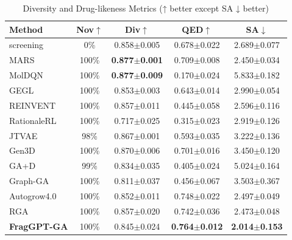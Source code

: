 \documentclass[lettersize,journal]{IEEEtran}
\begin{document}
\begin{table}[!t]
    \caption{Diversity and Drug-likeness Metrics (↑ better except SA ↓ better)}
    \label{tab:diversity_metrics}
    \centering    
    \small
    \setlength{\tabcolsep}{4pt}
    
    \begin{tabular}{l c c c c}
        \hline\hline
        Method & Nov$\uparrow$ & Div$\uparrow$ & QED$\uparrow$ & SA$\downarrow$ \\
        \hline
        screening\cite{graff2021accelerating} & 0\% & 0.858$\pm$0.005 & 0.678$\pm$0.022 & 2.689$\pm$0.077 \\
        MARS\cite{xie2021marsmarkovmolecularsampling} & 100\% & \textbf{0.877}$\pm$\textbf{0.001} & 0.709$\pm$0.008 & 2.450$\pm$0.034 \\
        MolDQN\cite{zhou2019optimization} & 100\% & \textbf{0.877}$\pm$\textbf{0.009} & 0.170$\pm$0.024 & 5.833$\pm$0.182 \\
        GEGL\cite{ahnGuidingDeepMolecular2020} & 100\% & 0.853$\pm$0.003 & 0.643$\pm$0.014 & 2.990$\pm$0.054 \\
        REINVENT\cite{olivecronaMolecularDeNovoDesign2017} & 100\% & 0.857$\pm$0.011 & 0.445$\pm$0.058 & 2.596$\pm$0.116 \\
        RationaleRL\cite{jinMultiObjectiveMoleculeGeneration2020} & 100\% & 0.717$\pm$0.025 & 0.315$\pm$0.023 & 2.919$\pm$0.126 \\
        JTVAE\cite{jinJunctionTreeVariational2018} & 98\% & 0.867$\pm$0.001 & 0.593$\pm$0.035 & 3.222$\pm$0.136 \\
        Gen3D\cite{luoGraph2022} & 100\% & 0.870$\pm$0.006 & 0.701$\pm$0.016 & 3.450$\pm$0.120 \\
        GA+D\cite{nigamAugmentingGeneticAlgorithms2020} & 99\% & 0.834$\pm$0.035 & 0.405$\pm$0.024 & 5.024$\pm$0.164 \\
        Graph-GA\cite{jensenGraphBasedGeneticAlgorithm2019} & 100\% & 0.811$\pm$0.037 & 0.456$\pm$0.067 & 3.503$\pm$0.367 \\
        Autogrow4.0\cite{spiegelAutoGrow4OpensourceGenetic2020} & 100\% & 0.852$\pm$0.011 & 0.748$\pm$0.022 & 2.497$\pm$0.049 \\
        RGA\cite{fuReinforcedGeneticAlgorithm}  & 100\% & 0.857$\pm$0.020 & 0.742$\pm$0.036 & 2.473$\pm$0.048 \\                 
        \hline
        \textbf{FragGPT-GA} & 100\% & 0.845$\pm$0.024 & \textbf{0.764$\pm$0.012} & \textbf{2.014$\pm$0.153} \\            
        \hline\hline
    \end{tabular}
\end{table}
\end{document}

